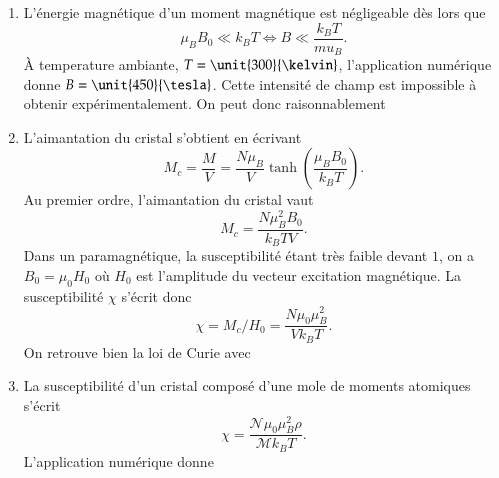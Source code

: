 \begin{corrige}
\begin{enumerate}
    \item L'énergie magnétique d'un moment magnétique est négligeable dès lors que 
      \begin{equation*}
	      \mu_B B_0 \ll k_B T \iff \boxed{B \ll \dfrac{k_B T}{mu_B}.}
      \end{equation*}
      À temperature ambiante, $T = \unit{300}{\kelvin}$, l'application numérique
      donne $B = \unit{450}{\tesla}$. Cette intensité de champ est impossible à obtenir
      expérimentalement. On peut donc raisonnablement 
      \item L'aimantation du cristal s'obtient en écrivant
      \begin{equation*}
	      M_c = \dfrac{M}{V} = \dfrac{N \mu_B}{V} 
	      \tanh\left(\dfrac{\mu_B B_0}{k_B T}\right).
      \end{equation*}
      Au premier ordre, l'aimantation du cristal vaut
      \begin{equation*}
	      \boxed{M_c = \dfrac{N \mu_B^2 B_0}{k_B T V}.}
      \end{equation*}
      Dans un paramagnétique, la susceptibilité étant très faible devant $1$, 
      on a $B_0 = \mu_0 H_0$ où $H_0$ est l'amplitude du vecteur excitation magnétique.
      La susceptibilité $\chi$ s'écrit donc
      \begin{equation*}
	      \boxed{\chi = M_c/H_0 = \dfrac{N \mu_0 \mu_B^2}{V k_B T}.}
      \end{equation*}
       On retrouve bien la loi de Curie avec 

      \item La susceptibilité 
      d'un cristal composé d'une mole de moments atomiques s'écrit
      \begin{equation*}
	      \chi = \dfrac{\mathcal{N} \mu_0 \mu_B^2 \rho}{\mathcal{M} k_B T}.
      \end{equation*}
      L'application numérique donne 
\end{enumerate}
\end{corrige}
